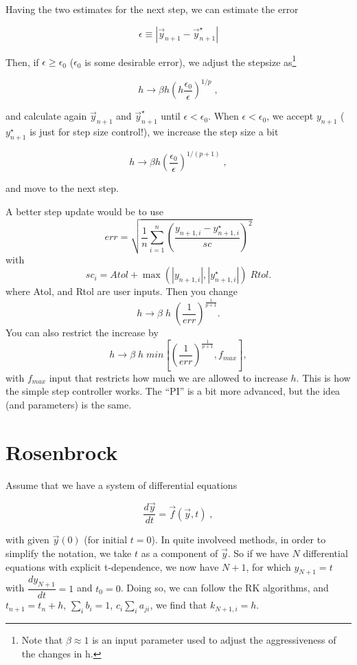 \documentclass[11pt,a4paper]{article}
\begin{document}
	Having the two estimates for the next step, we can estimate the error 
	
	$$
	\epsilon \equiv \left|\vec{y}_{n+1}- \vec{y}^{\star}_{n+1} \right|
	$$
	
	Then, if $\epsilon \geq \epsilon_0$ ($\epsilon_0$ is some desirable error), we adjust the stepsize as\footnote{ Note that $\beta \approx 1$ is an input parameter used to adjust the aggressiveness of the changes in h.}
	
	$$ 
	h \to \beta h \left (h\dfrac{\epsilon_0}{\epsilon} \right)^{1/p} \;,
	$$
	
	and calculate again $\vec{y}_{n+1}$ and $\vec{y}_{n+1}^{\star}$ until  $\epsilon < \epsilon_0$.
	When $\epsilon < \epsilon_0$, we accept $y_{n+1}$ ($y_{n+1}^{\star}$ is just for step size control!),
	we increase the step size a bit
	
	$$ 
	h \to \beta h \left (\dfrac{\epsilon_0}{\epsilon} \right)^{1/(p+1)} \;,
	$$
	
	and move to the next step.
	
%	
	A better step update would be to use 
	$$err = \sqrt{\frac{1}{n}\sum_{i=1}^n\left(\frac{y_{n+1 ,i}-y^{\star}_{n+1 ,i}}{sc}\right)^{2}}$$
	with
	$$sc_i = Atol + \max\left(|y_{n+1, i}|,|y^{\star}_{n+1 ,i}|\right)\; Rtol.$$
	where Atol, and Rtol are user inputs. Then you change
	$$h \to \beta \; h \;  \left(\frac{1}{err}\right)^{\frac{1}{p+1}}.$$
	You can also restrict the increase by
	$$h \to \beta \; h \;  min\left[\left(\frac{1}{err}\right)^{\frac{1}{p+1}}, f_{max}\right],$$
	with $f_{max}$ input that restricts how much we are allowed to increase $h$.	
	This is how the simple step controller works. The ``PI'' is a bit more advanced, but the idea (and parameters) is the same.




	\section{Rosenbrock}\label{sec:Rosenbrock}
	\setcounter{equation}{0}

	Assume that we have a system of differential equations
	
	$$
	\dfrac{d\vec{y}}{dt}=\vec{f}(\vec{y},t) \;,
	$$
	
	with  given $\vec{y}\left(0\right)$ (for initial $t=0$). In quite involveed methods, in order to simplify 
	the notation, we take $t$ as a component of $\vec{y}$. So if we have $N$ differential equations with
	explicit t-dependence, we now have $N+1$, for which $y_{N+1}=t$ with $\dfrac{dy_{N+1}}{dt}=1$ and $t_0 =0$.
	Doing so, we can follow the RK algorithms, and  $t_{n+1}=t_{n}+h$, $\sum_i b_i =1$, $c_i \sum_i a_{ji}$, 
	we find that $k_{N+1,i}=h$. 
	
\end{document}
